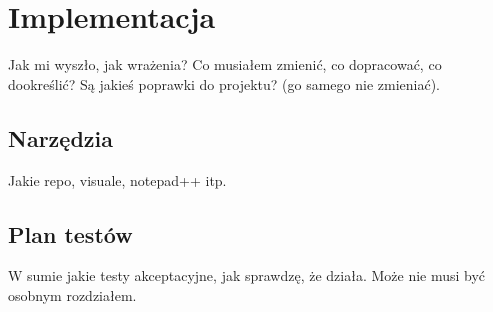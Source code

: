 \chapter{Implementacja}
Jak mi wyszło, jak wrażenia? Co musiałem zmienić, co dopracować, co dookreślić? Są jakieś poprawki do projektu? (go samego nie zmieniać).

\section{Narzędzia}
Jakie repo, visuale, notepad++ itp.

\section{Plan testów}
W sumie jakie testy akceptacyjne, jak sprawdzę, że działa. Może nie musi być osobnym rozdziałem.